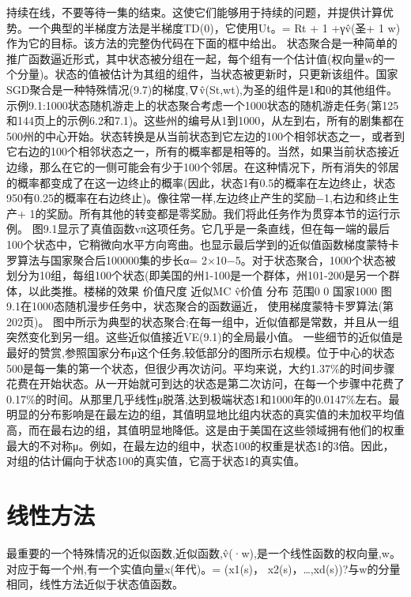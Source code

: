持续在线，不要等待一集的结束。这使它们能够用于持续的问题，并提供计算优势。一个典型的半梯度方法是半梯度TD(0)，它使用Ut。= Rt + 1 +γv̂(圣+ 1 w)作为它的目标。该方法的完整伪代码在下面的框中给出。
状态聚合是一种简单的推广函数逼近形式，其中状态被分组在一起，每个组有一个估计值(权向量w的一个分量)。状态的值被估计为其组的组件，当状态被更新时，只更新该组件。国家SGD聚合是一种特殊情况(9.7)的梯度,∇v̂(St,wt),为圣的组件是1和0的其他组件。
示例9.1:1000状态随机游走上的状态聚合考虑一个1000状态的随机游走任务(第125和144页上的示例6.2和7.1)。这些州的编号从1到1000，从左到右，所有的剧集都在500州的中心开始。状态转换是从当前状态到它左边的100个相邻状态之一，或者到它右边的100个相邻状态之一，所有的概率都是相等的。当然，如果当前状态接近边缘，那么在它的一侧可能会有少于100个邻居。在这种情况下，所有消失的邻居的概率都变成了在这一边终止的概率(因此，状态1有0.5的概率在左边终止，状态950有0.25的概率在右边终止)。像往常一样,左边终止产生的奖励−1,右边和终止生产+ 1的奖励。所有其他的转变都是零奖励。我们将此任务作为贯穿本节的运行示例。
图9.1显示了真值函数vπ这项任务。它几乎是一条直线，但在每一端的最后100个状态中，它稍微向水平方向弯曲。也显示最后学到的近似值函数梯度蒙特卡罗算法与国家聚合后100000集的步长α= 2×10−5。对于状态聚合，1000个状态被划分为10组，每组100个状态(即美国的州1-100是一个群体，州101-200是另一个群体，以此类推。楼梯的效果
价值尺度
  近似MC v̂价值
分布
范围0
0
国家1000
图9.1在1000态随机漫步任务中，状态聚合的函数逼近，
使用梯度蒙特卡罗算法(第202页)。
图中所示为典型的状态聚合;在每一组中，近似值都是常数，并且从一组突然变化到另一组。这些近似值接近VE(9.1)的全局最小值。
一些细节的近似值是最好的赞赏,参照国家分布μ这个任务,较低部分的图所示右规模。位于中心的状态500是每一集的第一个状态，但很少再次访问。平均来说，大约1.37\%的时间步骤花费在开始状态。从一开始就可到达的状态是第二次访问，在每一个步骤中花费了0.17\%的时间。从那里几乎线性μ脱落,达到极端状态1和1000年的0.0147\%左右。最明显的分布影响是在最左边的组，其值明显地比组内状态的真实值的未加权平均值高，而在最右边的组，其值明显地降低。这是由于美国在这些领域拥有他们的权重最大的不对称μ。例如，在最左边的组中，状态100的权重是状态1的3倍。因此，对组的估计偏向于状态100的真实值，它高于状态1的真实值。

\section{线性方法}

最重要的一个特殊情况的近似函数,近似函数,v̂(·w),是一个线性函数的权向量,w。对应于每一个州,有一个实值向量x(年代)。= (x1(s)， x2(s)，…,xd(s))?与w的分量相同，线性方法近似于状态值函数。


